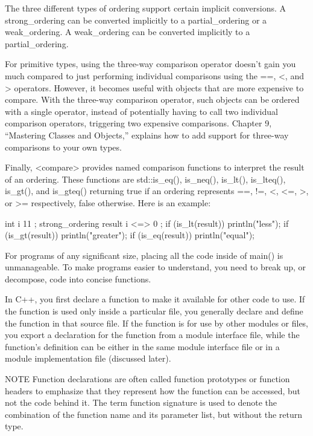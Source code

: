 The three different types of ordering support certain implicit conversions. A strong\_ordering can be converted implicitly to a partial\_ordering or a weak\_ordering. A weak\_ordering can be converted implicitly to a partial\_ordering.

For primitive types, using the three-way comparison operator doesn’t gain you much compared to just performing individual comparisons using the ==, <, and > operators. However, it becomes useful with objects that are more expensive to compare. With the three-way comparison operator, such objects can be ordered with a single operator, instead of potentially having to call two individual comparison operators, triggering two expensive comparisons. Chapter 9, “Mastering Classes and Objects,” explains how to add support for three-way comparisons to your own types.

Finally, <compare> provides named comparison functions to interpret the result of an ordering. These functions are std::is\_eq(), is\_neq(), is\_lt(), is\_lteq(), is\_gt(), and is\_gteq() returning true if an ordering represents ==, !=, <, <=, >, or >= respectively, false otherwise. Here is an example:

\begin{cpp}
int i { 11 };
strong_ordering result { i <=> 0 };
if (is_lt(result)) { println("less"); }
if (is_gt(result)) { println("greater"); }
if (is_eq(result)) { println("equal"); }
\end{cpp}


For programs of any significant size, placing all the code inside of main() is unmanageable. To make programs easier to understand, you need to break up, or decompose, code into concise functions.

In C++, you first declare a function to make it available for other code to use. If the function is used only inside a particular file, you generally declare and define the function in that source file. If the function is for use by other modules or files, you export a declaration for the function from a module interface file, while the function’s definition can be either in the same module interface file or in a module implementation file (discussed later).

\begin{myNotic}{NOTE}
Function declarations are often called function prototypes or function headers to emphasize that they represent how the function can be accessed, but not the code behind it. The term function signature is used to denote the combination of the function name and its parameter list, but without the return type.
\end{myNotic}

